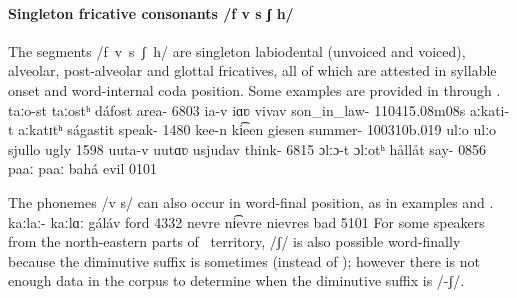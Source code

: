 \paragraph{Singleton fricative consonants /f v s ʃ h/}\label{fvssjh}
The segments \mbox{/f v s ʃ h/} are singleton labiodental (unvoiced and voiced), alveolar, post-alveolar and glottal fricatives, all of which are attested in syllable onset and word-internal coda position. %
Some examples are provided in  through .
	{taːo-st}		{taːostʰ}		{dáfost}	{area-}		{6803}
	{ia-v}	{iɑʋ}		{vivav}	{son\_in\_law-}	{110415}{.08m08s}
		{aːkati-t}	{aːkatɪtʰ}	{ságastit}	{speak-}		{1480}
	{kee-n}		{ki͡een}		{giesen}	{summer-}	{100310b}{.019}
			{ulːo}			{ulːo}			{sjullo}	{ugly\Sc{}}		{1598}
	{uuta-v}		{uutɑʋ}		{usjudav}	{think-}		{6815}
			{\Bf{h}ɔlːɔ-t}		{ɔlːotʰ}		{hållåt}	{say-}	{0856}
		{paaː}		{paaː}		{bahá}	{evil\BS{}}	{0101}

The phonemes /v s/ can also occur in word-final position, as in examples  and .%
	{kaːlaː-}	{kaːlɑː}	{gáláv}	{ford\BS{}}	{4332}
		{nevre}	{ni͡evre}	{nievres}	{bad\Sc{}}	{5101}
For some speakers from the north-eastern parts of \PS\ territory, /ʃ/ is also possible word-finally because the diminutive suffix is sometimes  (instead of ); however there is not enough data in the corpus to determine when the diminutive suffix is /-ʃ/. 

